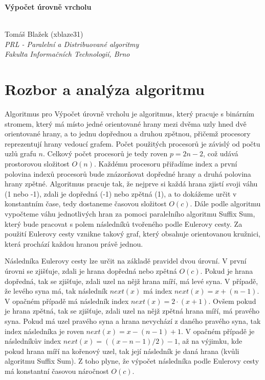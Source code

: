 \documentclass[12pt, a4paper]{article}
\begin{document}
\begin{center}
	\begin{huge}\textbf{Výpočet úrovně vrcholu}\end{huge} \\
	\vspace{0.4cm}
	Tomáš Blažek (xblaze31) \\
	\textit{PRL - Paralelní a Distribuované algoritmy} \\
	\textit{Fakulta Informačních Technologií, Brno} \\
\end{center}
 

\section{Rozbor a analýza algoritmu}
\label{sec:rozbor}
Algoritmus pro Výpočet úrovně vrcholu je algoritmus, který pracuje s binárním stromem, který má místo jedné orientované hrany mezi dvěma uzly hned dvě orientované hrany, a to jednu dopřednou a druhou zpětnou, přičemž procesory reprezentují hrany vedoucí grafem. Počet použitých procesorů je závislý od počtu uzlů grafu $n$. Celkový počet procesorů je tedy roven $p = 2n-2$, což udává prostorovou složitost $O(n)$. Každému procesoru přiřadíme index a první polovina indexů procesorů bude znázorňovat dopředné hrany a druhá polovina hrany zpětné. Algoritmus pracuje tak, že nejprve si každá hrana zjistí svoji váhu (1 nebo -1), zdali je dopředná (-1) nebo zpětná (1), a to dokážeme určit v konstantním čase, tedy dostaneme časovou složitost $O(c)$. Dále podle algoritmu vypočteme váhu jednotlivých hran za pomoci paralelního algoritmu Suffix Sum, který bude pracovat s polem následníků tvořeného podle Eulerovy cesty. Za použití Eulerovy cesty vznikne takový graf, který obsahuje orientovanou kružnici, která prochází každou hranou právě jednou.

Následníka Eulerovy cesty lze určit na základě pravidel dvou úrovní. V první úrovni se zjišťuje, zdali je hrana dopředná nebo zpětná  $O(c)$. Pokud je hrana dopředná, tak se zjišťuje, zdali uzel na nějž hrana míří, má levé syna. V případě, že levého syna má, tak následník $next(x)$ má index $next(x)=x+(n-1)$. V opačném případě má následník index $next(x)=2\cdot(x+1)$. Ovšem pokud je hrana zpětná, tak se zjišťuje, zdali uzel na nějž zpětná hrana míří, má pravého syna. Pokud má uzel pravého syna a hrana nevychází z daného pravého syna, tak index následníka je roven $next(x)=x-(n-1)+1$. V opačném případě je následníkův index $next(x)=((x-n-1)/2)-1$, až na výjimku, kde pokud hrana míří na kořenový uzel, tak její následník je daná hrana (kvůli algoritmu Suffix Sum). Z toho plyne, že výpočet následníka podle Eulerovy cesty má konstantní časovou náročnost $O(c)$.
\end{document}
